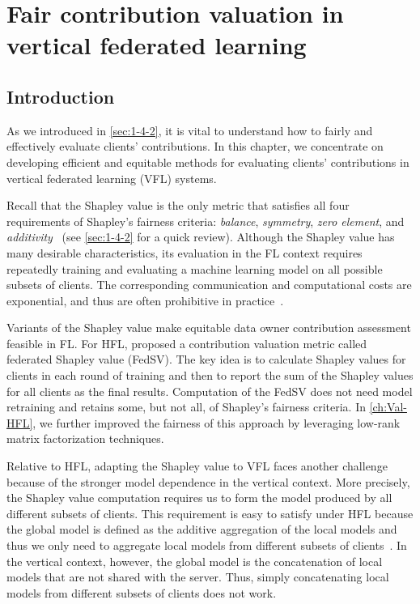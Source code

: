 \chapter{Fair contribution valuation in vertical federated
learning}
\label{ch:Val-VFL}

\section{Introduction} \label{sec:8-1}
As we introduced in \autoref{sec:1-4-2}, it is vital to understand how to fairly and effectively evaluate clients' contributions. In this chapter, we concentrate on developing efficient and equitable methods for evaluating clients' contributions in vertical federated learning (VFL) systems.

Recall that the Shapley value is the only metric that satisfies all four requirements of Shapley's fairness criteria: \emph{balance}, \emph{symmetry}, \emph{zero element}, and \emph{additivity}~\citep{dubey1975uniqueness} (see \autoref{sec:1-4-2} for a quick review).  Although the Shapley value has many desirable characteristics, its evaluation in the FL context requires repeatedly training and evaluating a machine learning model on all possible subsets of clients. The corresponding communication and computational costs are exponential, and thus are often prohibitive in practice~\citep{song2019profit,wang2019measure,fan2021improving}. 

Variants of the Shapley value make equitable data owner contribution assessment feasible in FL. For HFL, \citet{wang2020principled} proposed a contribution valuation metric called federated Shapley value (FedSV). The key idea is to calculate Shapley values for clients in each round of training and then to report the sum of the Shapley values for all clients as the final results. Computation of the FedSV does not need model retraining and retains some, but not all, of Shapley's fairness criteria. In \autoref{ch:Val-HFL}, we further improved the fairness of this approach by leveraging low-rank matrix factorization techniques. 

Relative to HFL, adapting the Shapley value to VFL faces another challenge because of the stronger model dependence in the vertical context. More precisely, the Shapley value computation requires us to form the model produced by all different subsets of clients. This requirement is easy to satisfy under HFL because the global model is defined as the additive aggregation of the local models and thus we only need to aggregate local models from different subsets of clients~\citep{wang2020principled}. In the vertical context, however, the global model is the concatenation of local models that are not shared with the server. Thus, simply concatenating local models from different subsets of clients does not work. 

